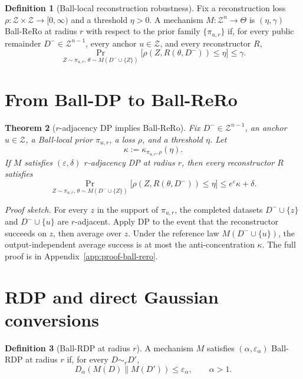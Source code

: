 \documentclass[11pt,a4paper]{report}
\theoremstyle{plain}
\newtheorem{theorem}{Theorem}[chapter]
\theoremstyle{definition}
\newtheorem{definition}[theorem]{Definition}
\theoremstyle{remark}
\newcommand{\cZ}{\mathcal{Z}}
\begin{document}
\begin{definition}[Ball-local reconstruction robustness]
\label{def:ball-rero}
Fix a reconstruction loss $\rho:\cZ\times\cZ\to[0,\infty)$ and a threshold $\eta>0$.  A mechanism $M:\cZ^n\to\Theta$ is $(\eta,\gamma)$ Ball-ReRo at radius $r$ with respect to the prior family $\{\pi_{u,r}\}$ if, for every public remainder $D^-\in\cZ^{n-1}$, every anchor $u\in\cZ$, and every reconstructor $R$,
\[
\Pr_{Z\sim\pi_{u,r},\,\theta\sim M(D^-\cup\{Z\})}
\big[\rho(Z,R(\theta,D^-))\le\eta\big]
\le\gamma.
\]
\end{definition}

\section{From Ball-DP to Ball-ReRo}
\label{sec:dp-to-rero}

\begin{theorem}[$r$-adjacency DP implies Ball-ReRo]
\label{thm:ball-dp-rero}
Fix $D^-\in\cZ^{n-1}$, an anchor $u\in\cZ$, a Ball-local prior $\pi_{u,r}$, a loss $\rho$, and a threshold $\eta$.  Let
\[
\kappa:=\kappa_{\pi_{u,r},\rho}(\eta).
\]
If $M$ satisfies $(\varepsilon,\delta)$ $r$-adjacency DP at radius $r$, then every reconstructor $R$ satisfies
\[
\Pr_{Z\sim\pi_{u,r},\,\theta\sim M(D^-\cup\{Z\})}
\big[\rho(Z,R(\theta,D^-))\le\eta\big]
\le e^\varepsilon\kappa+\delta.
\]
\end{theorem}

\noindent\emph{Proof sketch.}
For every $z$ in the support of $\pi_{u,r}$, the completed datasets $D^-\cup\{z\}$ and $D^-\cup\{u\}$ are $r$-adjacent.  Apply DP to the event that the reconstructor succeeds on $z$, then average over $z$.  Under the reference law $M(D^-\cup\{u\})$, the output-independent average success is at most the anti-concentration $\kappa$.  The full proof is in Appendix~\ref{app:proof-ball-rero}.

\section{RDP and direct Gaussian conversions}
\label{sec:rdp-direct-gaussian}

\begin{definition}[Ball-RDP at radius $r$]
A mechanism $M$ satisfies $(\alpha,\varepsilon_\alpha)$ Ball-RDP at radius $r$ if, for every $D\sim_rD'$,
\[
D_\alpha(M(D)\|M(D'))\le \varepsilon_\alpha,
\qquad \alpha>1.
\]
\end{definition}
\end{document}
